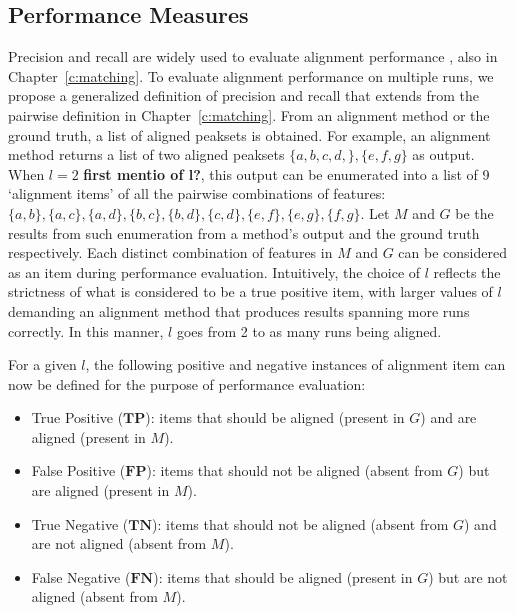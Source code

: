 \subsection{Performance Measures}

Precision and recall are widely used to evaluate alignment performance \cite{Lange2008, Pluskal2010, Ballardini2011, Voss2011a, Sandin2013}, also in Chapter~\ref{c:matching}. To evaluate alignment performance on multiple runs, we propose a generalized definition of precision and recall that extends from the pairwise definition in Chapter~\ref{c:matching}. From an alignment method or the ground truth, a list of aligned peaksets is obtained. For example, an alignment method returns a list of two aligned peaksets $\{a,b,c,d,\},\allowbreak\{e,f,g\}$ as output. When $l=2$ \textbf{first mentio of l?}, this output can be enumerated into a list of 9 `alignment items' of all the pairwise combinations of features: $\{a,b\},\allowbreak\{a,c\},\allowbreak\{a,d\},\allowbreak\{b,c\},\allowbreak\{b,d\},\allowbreak\{c,d\},\allowbreak\{e,f\},\allowbreak\{e,g\},\allowbreak\{f,g\}$. Let $M$ and $G$ be the results from such enumeration from a method's output and the ground truth respectively. Each distinct combination of features in $M$ and $G$ can be considered as an item during performance evaluation. Intuitively, the choice of $l$ reflects the strictness of what is considered to be a true positive item, with larger values of $l$ demanding an alignment method that produces results spanning more runs correctly. In this manner, $l$ goes from 2 to as many runs being aligned.

For a given $l$, the following positive and negative instances of alignment item can now be defined for the purpose of performance evaluation:
\begin{itemize}
\item True Positive ($\boldsymbol{TP}$): items that should be aligned (present in $G$) and are aligned (present in $M$).
\item False Positive ($\boldsymbol{FP}$): items that should not be aligned (absent from $G$) but are aligned (present in $M$).
\item True Negative ($\boldsymbol{TN}$): items that should not be aligned (absent from $G$) and are not aligned (absent from $M$).
\item False Negative ($\boldsymbol{FN}$): items that should be aligned (present in $G$) but are not aligned (absent from $M$).
\end{itemize}


